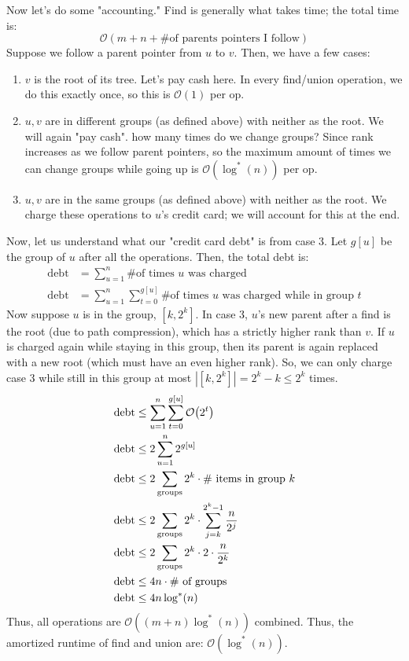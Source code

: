 \begin{algothm}
\begin{proof*}
        Now let's do some "accounting." Find is generally what takes time; the total time is:
        \[ \mathcal{O}(m + n + \text{\# of parents pointers I follow}) \]
        Suppose we follow a parent pointer from $u$ to $v$. Then, we have a few cases:
        \begin{enumerate}
            \item $v$ is the root of its tree. Let's pay cash here. In every find/union operation, we do this exactly once, so this is $\mathcal{O}(1)$ per op.
            \item $u, v$ are in different groups (as defined above) with neither as the root. We will again "pay cash".
            how many times do we change groups? Since rank increases as we follow parent pointers,
            so the maximum amount of times we can change groups while going up is $\mathcal{O}(\log^*(n))$ per op.
            \item $u, v$ are in the same groups (as defined above) with neither as the root. We charge these operations to $u$'s credit card; we will account for this at the end.
        \end{enumerate}
        Now, let us understand what our "credit card debt" is from case 3. Let $g[u]$ be the group of 
        $u$ after all the operations. Then, the total debt is:
        \begin{align*}
            \text{debt} &= \sum_{u = 1}^{n} \text{\# of times $u$ was charged} \\
            \text{debt} &= \sum_{u = 1}^{n} \sum_{t = 0}^{g[u]}\text{\# of times $u$ was charged while in group $t$}
        \end{align*}
        Now suppose $u$ is in the group, $[k, 2^k]$. In case 3, $u$'s new parent after a find is the root (due to path compression), which has a strictly higher rank than $v$. If $u$ is charged again
        while staying in this group, then its parent is again replaced with a new root (which must have an even higher rank). So, we can only charge case 3 while still in this group
        at most $|[k, 2^k]| = 2^k - k \leq 2^k$ times.
        \begin{align*}
            \text{debt} &\leq \sum_{u = 1}^{n} \sum_{t = 0}^{g[u]} \mathcal{O}\qty(2^t) \\
            \text{debt} &\leq 2 \sum_{u = 1}^n 2^{g[u]} \\
            \text{debt} &\leq 2 \sum_{\text{groups}} 2^k \cdot \text{\# items in group $k$} \\
            \text{debt} &\leq 2 \sum_{\text{groups}} 2^k \cdot \sum_{j = k}^{2^{k} - 1} \frac{n}{2^j} \\
            \text{debt} &\leq 2 \sum_{\text{groups}} 2^k \cdot 2 \cdot \frac{n}{2^k} \\
            \text{debt} &\leq 4n \cdot \text{\# of groups} \\
            \text{debt} &\leq 4 n \log^*(n)
        \end{align*}
        Thus, all operations are $\mathcal{O}((m + n) \log^*(n))$ combined. Thus, the amortized runtime of find and union are:
        $\mathcal{O}(\log^*(n))$.
    \end{proof*}
\end{algothm}